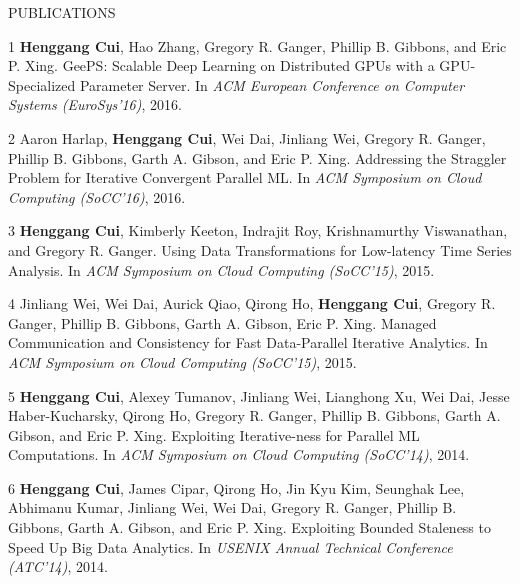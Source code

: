 \documentclass{resume} %
\begin{document}
\begin{rSection}{PUBLICATIONS}
\vspace{-.1in}
    \item
    [1]
        {\bf Henggang Cui}, Hao Zhang, Gregory R. Ganger, Phillip B. Gibbons, and Eric P. Xing.
        GeePS: Scalable Deep Learning on Distributed GPUs with a GPU-Specialized Parameter Server.
        In \emph{ACM European Conference on Computer Systems (EuroSys'16)},
        2016.
    \item
    [2]
        Aaron Harlap, {\bf Henggang Cui}, Wei Dai, Jinliang Wei,
        Gregory R. Ganger, Phillip B. Gibbons, Garth A. Gibson, and Eric P. Xing.
        Addressing the Straggler Problem for Iterative Convergent Parallel ML.
        In \emph{ACM Symposium on Cloud Computing (SoCC'16)},
        2016.
    \item
    [3]
        {\bf Henggang Cui}, Kimberly Keeton, Indrajit Roy, Krishnamurthy Viswanathan, and Gregory R. Ganger.
        Using Data Transformations for Low-latency Time Series Analysis.
        In \emph{ACM Symposium on Cloud Computing (SoCC'15)},
        2015.
    \item
    [4]
        Jinliang Wei, Wei Dai, Aurick Qiao, Qirong Ho, {\bf Henggang Cui},
        Gregory R. Ganger, Phillip B. Gibbons, Garth A. Gibson, Eric P. Xing.
        Managed Communication and Consistency for Fast Data-Parallel Iterative Analytics.
        In \emph{ACM Symposium on Cloud Computing (SoCC'15)},
        2015.
    \item
    [5]
        {\bf Henggang Cui}, Alexey Tumanov, Jinliang Wei, Lianghong Xu, Wei Dai,
        Jesse Haber-Kucharsky, Qirong Ho, Gregory R. Ganger, Phillip B. Gibbons, Garth A. Gibson, and Eric P. Xing.
        Exploiting Iterative-ness for Parallel ML Computations.
        In \emph{ACM Symposium on Cloud Computing (SoCC'14)},
        2014.
    \item
    [6]
        {\bf Henggang Cui}, James Cipar, Qirong Ho, Jin Kyu Kim, Seunghak Lee, Abhimanu Kumar,
        Jinliang Wei, Wei Dai, Gregory R. Ganger, Phillip B. Gibbons, Garth A. Gibson, and Eric P. Xing.
        Exploiting Bounded Staleness to Speed Up Big Data Analytics.
        In \emph{USENIX Annual Technical Conference (ATC'14)},
        2014.
    \item

\end{rSection}
\end{document}
